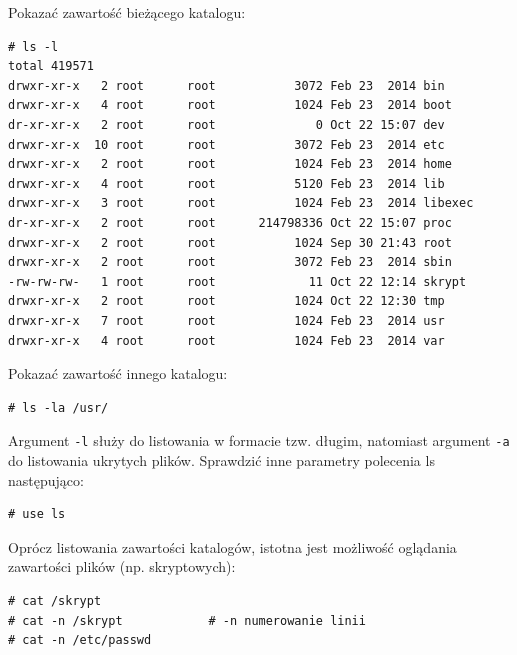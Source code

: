 \begin{example}\label{ex:wylistowanie} 

Pokazać zawartość bieżącego katalogu: 

\begin{lstlisting}[style=MyBashStyle]
# ls -l 
total 419571
drwxr-xr-x   2 root      root           3072 Feb 23  2014 bin
drwxr-xr-x   4 root      root           1024 Feb 23  2014 boot
dr-xr-xr-x   2 root      root              0 Oct 22 15:07 dev
drwxr-xr-x  10 root      root           3072 Feb 23  2014 etc
drwxr-xr-x   2 root      root           1024 Feb 23  2014 home
drwxr-xr-x   4 root      root           5120 Feb 23  2014 lib
drwxr-xr-x   3 root      root           1024 Feb 23  2014 libexec
dr-xr-xr-x   2 root      root      214798336 Oct 22 15:07 proc
drwxr-xr-x   2 root      root           1024 Sep 30 21:43 root
drwxr-xr-x   2 root      root           3072 Feb 23  2014 sbin
-rw-rw-rw-   1 root      root             11 Oct 22 12:14 skrypt
drwxr-xr-x   2 root      root           1024 Oct 22 12:30 tmp
drwxr-xr-x   7 root      root           1024 Feb 23  2014 usr
drwxr-xr-x   4 root      root           1024 Feb 23  2014 var
\end{lstlisting}

Pokazać zawartość innego katalogu: 

\begin{lstlisting}[style=MyBashStyle]
# ls -la /usr/
\end{lstlisting}

Argument \lstinline[style=MyBashStyle]{-l} służy do listowania w formacie tzw. długim, natomiast argument \lstinline[style=MyBashStyle]{-a} do listowania ukrytych plików. Sprawdzić inne parametry polecenia ls następująco:  

\begin{lstlisting}[style=MyBashStyle]
# use ls
\end{lstlisting}
\end{example}

\begin{example}\label{ex:obejrzenie} 

Oprócz listowania zawartości katalogów, istotna jest możliwość oglądania zawartości plików (np. skryptowych):

\begin{lstlisting}[style=MyBashStyle]
# cat /skrypt
# cat -n /skrypt			# -n numerowanie linii
# cat -n /etc/passwd
\end{lstlisting}
\end{example}


